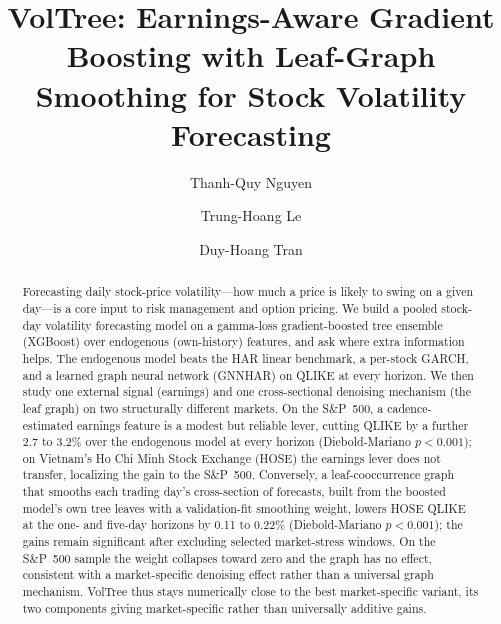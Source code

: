 \documentclass[runningheads,a4paper]{llncs}
\begin{document}
\title{VolTree: Earnings-Aware Gradient Boosting with Leaf-Graph Smoothing for Stock Volatility Forecasting}

\author{Thanh-Quy Nguyen \and Trung-Hoang Le \and Duy-Hoang Tran}

\maketitle
\pagestyle{empty}\thispagestyle{empty}   %

\begin{abstract}
Forecasting daily stock-price volatility---how much a price is likely to swing on a given day---is a core
input to risk management and option pricing. We build a pooled stock-day volatility forecasting model on a
gamma-loss gradient-boosted tree ensemble (XGBoost) over endogenous (own-history) features, and ask where
extra information helps. The endogenous model beats the HAR linear benchmark, a per-stock GARCH, and a learned graph neural network (GNNHAR) on QLIKE at every
horizon. We then study one external signal (earnings) and one cross-sectional denoising mechanism (the leaf
graph) on two structurally different markets. On the S\&P~500, a cadence-estimated earnings feature is a
modest but reliable lever,
cutting QLIKE by a further 2.7 to 3.2\% over the endogenous model at every horizon (Diebold-Mariano
$p<0.001$); on Vietnam's Ho Chi Minh Stock Exchange (HOSE) the earnings lever does not
transfer, localizing the gain to the S\&P~500. Conversely, a leaf-cooccurrence graph that smooths each trading day's
cross-section of forecasts, built from the boosted model's own tree leaves with a validation-fit smoothing
weight, lowers HOSE QLIKE at the one- and five-day horizons by 0.11 to 0.22\% (Diebold-Mariano $p<0.001$); the
gains remain significant after excluding selected market-stress windows. On the S\&P~500 sample the weight
collapses toward zero and the graph has no effect, consistent with a market-specific denoising effect
rather than a universal graph mechanism. VolTree thus stays numerically close to the best market-specific
variant, its two components giving market-specific rather than universally additive gains.
\end{abstract}
\end{document}
